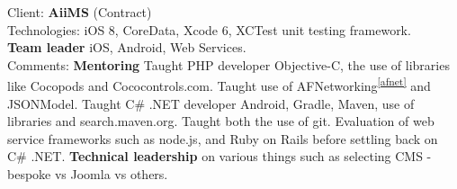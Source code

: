 \documentclass{article}
\begin{document}
Client: 	\textbf  {AiiMS} (Contract)  \\

Technologies: 	iOS 8, CoreData, Xcode 6, XCTest unit testing framework. \\
		{\bf Team leader} iOS, Android, Web Services. \\
Comments:	{\bf Mentoring} Taught PHP developer Objective-C, the use of libraries like Cocopods and Cococontrols.com. Taught use of AFNetworking\textsuperscript{\ref{afnet}} and JSONModel. 
	Taught C\# .NET developer Android, Gradle, Maven, use of libraries and search.maven.org. 
	Taught both the use of git.  
	Evaluation of web service frameworks such as node.js, and Ruby on Rails before settling back on C\# .NET.
	\textbf{Technical leadership} on various things such as selecting CMS - bespoke vs Joomla vs others. \\
\\
\end{document}
